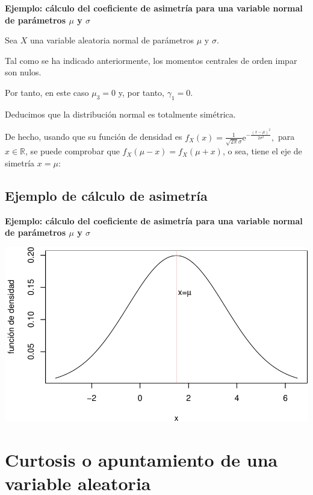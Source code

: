 \documentclass[]{book}
\begin{document}
\textbf{Ejemplo: cálculo del coeficiente de asimetría para una variable normal de parámetros \(\mu\) y \(\sigma\)}

Sea \(X\) una variable aleatoria normal de parámetros \(\mu\) y \(\sigma\).

Tal como se ha indicado anteriormente, los momentos centrales de orden impar son nulos.

Por tanto, en este caso \(\mu_3=0\) y, por tanto, \(\gamma_1=0\).

Deducimos que la distribución normal es totalmente simétrica.

De hecho, usando que su función de densidad es \(f_X(x)=\frac{1}{\sqrt{2\pi}\sigma}\mathrm{e}^{-\frac{(x-\mu)^2}{2\sigma^2}},\) para \(x\in \mathbb{R}\), se puede comprobar que \(f_X(\mu-x)=f_X(\mu +x)\), o sea, tiene el eje de simetría \(x=\mu\):

\hypertarget{ejemplo-de-cuxe1lculo-de-asimetruxeda-3}{%
\subsection{Ejemplo de cálculo de asimetría}\label{ejemplo-de-cuxe1lculo-de-asimetruxeda-3}}

\textbf{Ejemplo: cálculo del coeficiente de asimetría para una variable normal de parámetros \(\mu\) y \(\sigma\)}

\includegraphics{curso-probabilidad-udemy_files/figure-latex/unnamed-chunk-106-1.pdf}

\hypertarget{curtosis-o-apuntamiento-de-una-variable-aleatoria}{%
\section{Curtosis o apuntamiento de una variable aleatoria}\label{curtosis-o-apuntamiento-de-una-variable-aleatoria}}
\end{document}
